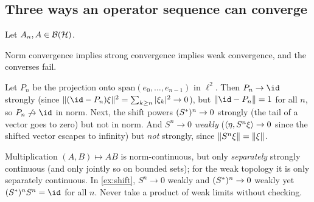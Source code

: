 \subsection{Three ways an operator sequence can converge}

Let $A_n,A\in\mathcal{B}(\mathcal{H})$.
\begin{center}
\renewcommand{\arraystretch}{1.3}
\end{center}
Norm convergence implies strong convergence implies weak convergence, and the converses fail.

\begin{example}\label{ex:shift}
Let $P_n$ be the projection onto $\mathrm{span}(e_0,\dots,e_{n-1})$ in $\ell^2$. Then $P_n\to\id$ strongly (since $\norm{(\id-P_n)\xi}^2=\sum_{k\ge n}|\xi_k|^2\to0$), but $\norm{\id-P_n}=1$ for all $n$, so $P_n\not\to\id$ in norm. Next, the shift powers $(S^{*})^n\to0$ strongly (the tail of a vector goes to zero) but not in norm. And $S^n\to0$ \emph{weakly} ($\langle \eta,S^n\xi\rangle\to0$ since the shifted vector escapes to infinity) but \emph{not} strongly, since $\lVert S^n\xi\rVert=\lVert \xi\rVert$.
\end{example}

\begin{whatwrong}
Multiplication $(A,B)\mapsto AB$ is norm-continuous, but only \emph{separately} strongly continuous (and only jointly so on bounded sets); for the weak topology it is only separately continuous. In \cref{ex:shift}, $S^n\to0$ weakly and $(S^{*})^n\to0$ weakly yet $(S\ad)^nS^n=\id$ for all $n$. Never take a product of weak limits without checking.
\end{whatwrong}

